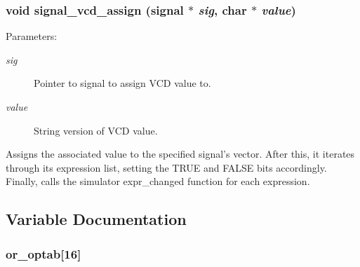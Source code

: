 \subsubsection{\setlength{\rightskip}{0pt plus 5cm}void signal\_\-vcd\_\-assign ({\bf signal} $\ast$ {\em sig}, char $\ast$ {\em value})}\label{signal_8c_a6}


\begin{Desc}
\item[Parameters: ]\par
\begin{description}
\item[{\em 
sig}]Pointer to signal to assign VCD value to. \item[{\em 
value}]String version of VCD value.\end{description}
\end{Desc}
Assigns the associated value to the specified signal's vector. After this, it iterates through its expression list, setting the TRUE and FALSE bits accordingly. Finally, calls the simulator expr\_\-changed function for each expression. 

\subsection{Variable Documentation}
\subsubsection{ or\_\-optab[16]}\label{signal_8c_a0}


